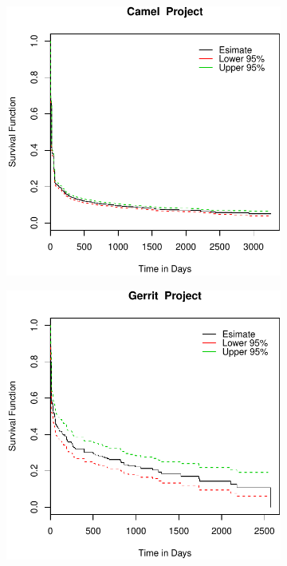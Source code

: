 \begin{figure}[t]
	\centering
	
	\begin{subfigure}[b]{0.195\textwidth}
		\includegraphics[width=\textwidth]{figures/Survival/camel.pdf}
		\label{fig:removal_comparison_camel_survival}
	\end{subfigure}
	\begin{subfigure}[b]{0.195\textwidth}
		\includegraphics[width=\textwidth]{figures/Survival/gerrit.pdf}

\end{subfigure}
\end{figure}
